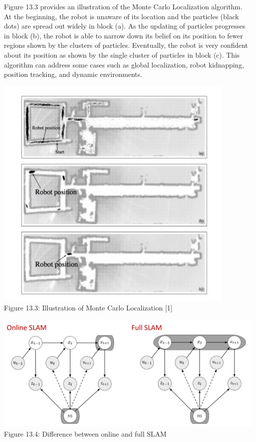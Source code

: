 Figure 13.3 provides an illustration of the Monte Carlo Localization algorithm. At the beginning, the robot is unaware of its location and the particles (black dots) are spread out widely in block (a). As the updating of particles progresses in block (b), the robot is able to narrow down its belief on its position to fewer regions shown by the clusters of particles. Eventually, the robot is very confident about its position as
shown by the single cluster of particles in block (c). This algorithm can address some cases such as global localization, robot kidnapping, position tracking, and dynamic environments.

\begin{center}
\includegraphics[scale = 0.5]{monte_illustration.JPG}\\
Figure 13.3: Illustration of Monte Carlo Localization [1]
\end{center}

\begin{center}
\includegraphics[scale = 0.4]{SLAM_Difference.JPG}\\
Figure 13.4: Difference between online and full SLAM
\end{center}
